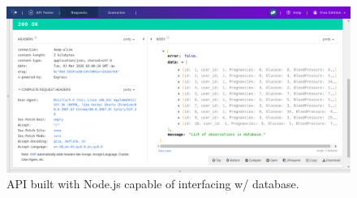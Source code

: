 \documentclass[12pt]{article}
\begin{document}
{
\clearpage
\begin{landscape}
\begin{figure}[ht]
\centering
\includegraphics[width=1.5\textwidth]{nodejsapi.png}
\caption{\label{fig:58} API built with Node.js capable of interfacing w/ database.}
\end{figure}
\end{landscape}
}
\clearpage
\newpage
\nocite{*}
 

\end{document}
